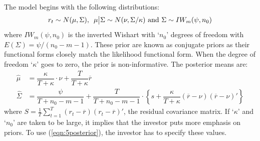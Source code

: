 The model begins with the following distributions:
	\begin{equation}\label{eqn:5distributions}
	r_t \sim N(\mu,\Sigma), \enskip \mu \big| \Sigma \sim N(\nu, \Sigma/\kappa) \text{ and } \Sigma \sim IW_m(\psi,n_0)
	\end{equation}
where $IW_m(\psi,n_0)$ is the inverted Wishart with `$n_0$' degrees of freedom with $E(\Sigma)=\psi/(n_0-m-1)$. These prior are known as conjugate priors as their functional forms closely match the likelihood functional form. When the degree of freedom `$\kappa$' goes to zero, the prior is non-informative. The posterior means are:
	\begin{equation}\label{eqn:5posterior}
	\begin{split}
	\hat{\mu}&= \dfrac{\kappa}{T+\kappa} \cdot \nu + \dfrac{T}{T+\kappa} \overline{r} \\
	\hat{\Sigma}&= \dfrac{\psi}{T+n_0-m-1} + \dfrac{T}{T+n_0-m-1} \cdot \left\{s+ \dfrac{\kappa}{T+\kappa} (\overline{r}-\nu)(\overline{r}-\nu)' \right\}
	\end{split}
	\end{equation}
where $S=\frac{1}{T} \sum_{t=1}^T (r_t-\overline{r})(r_t-\overline{r})'$, the residual covariance matrix. If `$\kappa$' and `$n_0$' are taken to be large, it implies that the investor puts more emphasis on priors. To use (\ref{eqn:5posterior}), the investor has to specify these values. 


